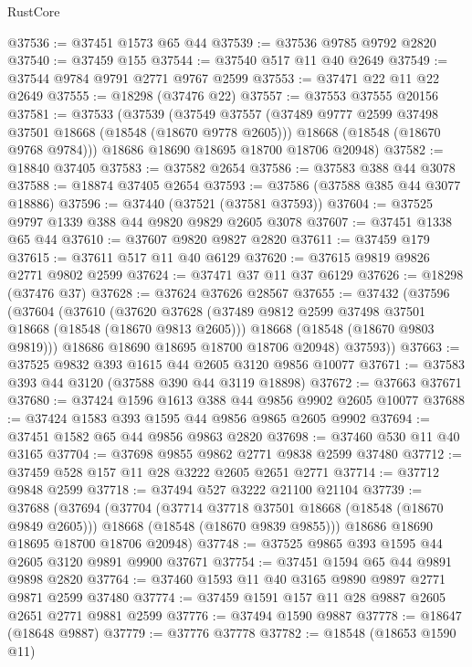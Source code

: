 \begin{lexlean}{RustCore}
\begin{coremodule}
@37536 := @37451 @1573 @65 @44
@37539 := @37536 @9785 @9792 @2820
@37540 := @37459 @155
@37544 := @37540 @517 @11 @40 @2649
@37549 := @37544 @9784 @9791 @2771 @9767 @2599
@37553 := @37471 @22 @11 @22 @2649
@37555 := @18298 (@37476 @22)
@37557 := @37553 @37555 @20156
@37581 := @37533
    (@37539
      (@37549
        @37557
        (@37489 @9777 @2599 @37498 @37501 @18668 (@18548 (@18670 @9778 @2605)))
        @18668
        (@18548 (@18670 @9768 @9784)))
      @18686
      @18690
      @18695
      @18700
      @18706
      @20948)
@37582 := @18840 @37405
@37583 := @37582 @2654
@37586 := @37583 @388 @44 @3078
@37588 := @18874 @37405 @2654
@37593 := @37586 (@37588 @385 @44 @3077 @18886)
@37596 := @37440 (@37521 (@37581 @37593))
@37604 := @37525 @9797 @1339 @388 @44 @9820 @9829 @2605 @3078
@37607 := @37451 @1338 @65 @44
@37610 := @37607 @9820 @9827 @2820
@37611 := @37459 @179
@37615 := @37611 @517 @11 @40 @6129
@37620 := @37615 @9819 @9826 @2771 @9802 @2599
@37624 := @37471 @37 @11 @37 @6129
@37626 := @18298 (@37476 @37)
@37628 := @37624 @37626 @28567
@37655 := @37432
    (@37596
      (@37604
        (@37610
          (@37620
            @37628
            (@37489 @9812 @2599 @37498 @37501 @18668 (@18548 (@18670 @9813 @2605)))
            @18668
            (@18548 (@18670 @9803 @9819)))
          @18686
          @18690
          @18695
          @18700
          @18706
          @20948)
        @37593))
@37663 := @37525 @9832 @393 @1615 @44 @2605 @3120 @9856 @10077
@37671 := @37583 @393 @44 @3120 (@37588 @390 @44 @3119 @18898)
@37672 := @37663 @37671
@37680 := @37424 @1596 @1613 @388 @44 @9856 @9902 @2605 @10077
@37688 := @37424 @1583 @393 @1595 @44 @9856 @9865 @2605 @9902
@37694 := @37451 @1582 @65 @44 @9856 @9863 @2820
@37698 := @37460 @530 @11 @40 @3165
@37704 := @37698 @9855 @9862 @2771 @9838 @2599 @37480
@37712 := @37459 @528 @157 @11 @28 @3222 @2605 @2651 @2771
@37714 := @37712 @9848 @2599
@37718 := @37494 @527 @3222 @21100 @21104
@37739 := @37688
    (@37694
      (@37704
        (@37714 @37718 @37501 @18668 (@18548 (@18670 @9849 @2605)))
        @18668
        (@18548 (@18670 @9839 @9855)))
      @18686
      @18690
      @18695
      @18700
      @18706
      @20948)
@37748 := @37525 @9865 @393 @1595 @44 @2605 @3120 @9891 @9900 @37671
@37754 := @37451 @1594 @65 @44 @9891 @9898 @2820
@37764 := @37460 @1593 @11 @40 @3165 @9890 @9897 @2771 @9871 @2599 @37480
@37774 := @37459 @1591 @157 @11 @28 @9887 @2605 @2651 @2771 @9881 @2599
@37776 := @37494 @1590 @9887
@37778 := @18647 (@18648 @9887)
@37779 := @37776 @37778
@37782 := @18548 (@18653 @1590 @11)

\end{coremodule}
\end{lexlean}
